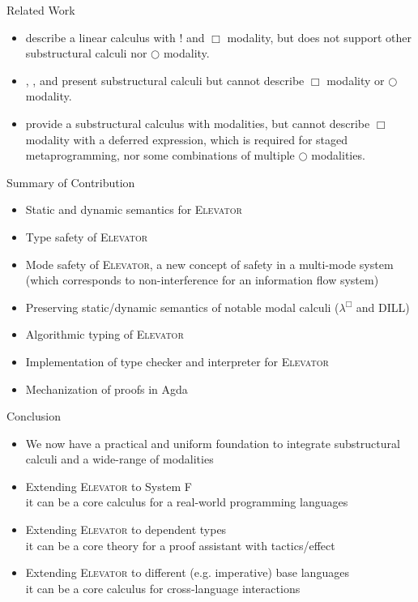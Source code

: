 \documentclass[letterpaper,12pt,aspectratio=169,show notes,dvipsnames]{beamer}
\newcommand{\elevator}{\textsc{Elevator}\xspace}
\begin{document}
\begin{frame}{Related Work}
  \color{black}
  \begin{itemize}[<+->]
  \item \citet{Fukuda:FSCD19} describe a linear calculus with \(!\) and \(\Box\) modality, but does not support other substructural calculi nor \(\bigcirc\) modality.
  \item \citet{Atkey:LICS18}, \citet{Orchard:ICFP19}, and \citet{Choudhury:POPL21} present substructural calculi but cannot describe \(\Box\) modality or \(\bigcirc\) modality.
  \item \citet{Abel:ICFP20} provide a substructural calculus with modalities, but cannot describe \(\Box\) modality with a deferred expression, which is required for staged metaprogramming,
    nor some combinations of multiple \(\bigcirc\) modalities.
  \end{itemize}
\end{frame}

\begin{frame}{Summary of Contribution}
  \color{black}
  \begin{itemize}[<+->]
  \item Static and dynamic semantics for \elevator
  \item Type safety of \elevator
  \item Mode safety of \elevator, a new concept of safety in a multi-mode system (which corresponds to non-interference for an information flow system)
  \item Preserving static/dynamic semantics of notable modal calculi (\(\lambda^{\Box}\) and DILL)
  \item Algorithmic typing of \elevator
  \item Implementation of type checker and interpreter for \elevator
  \item Mechanization of proofs in Agda
  \end{itemize}
\end{frame}

\begin{frame}{Conclusion}
  \color{black}
  \begin{itemize}[<+->]
  \item We now have a practical and uniform foundation to integrate substructural calculi and a wide-range of modalities
  \item Extending \elevator to System F\\ \textemdash{} it can be a core calculus for a real-world programming languages
  \item Extending \elevator to dependent types\\ \textemdash{} it can be a core theory for a proof assistant with tactics/effect
  \item Extending \elevator to different (e.g. imperative) base languages \\ \textemdash{} it can be a core calculus for cross-language interactions
  \end{itemize}
\end{frame}
\end{document}
